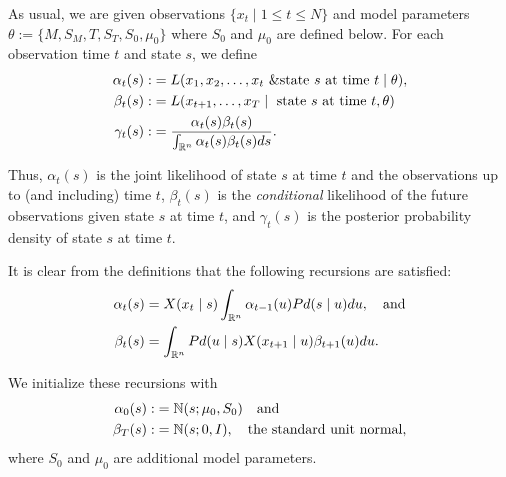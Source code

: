 \documentclass[12pt,leqno]{article}
\begin{document}
As usual, we are given observations $\{x_t\mid 1\le t\le N\}$ and model parameters $\theta := \{M,S_M,T,S_T,S_0,\mu_0\}$
where $S_0$ and $\mu_0$ are defined below.  For each observation time $t$ and state $s$, we define
\begin{align*}
  \alpha_t(s) :&= L(x_1,x_2,\dots,x_t~ \& \text{state $s$ at time $t$}\mid \theta ),\\
  \beta_t(s) :&= L(x_{t+1},\dots,x_T \mid ~\text{state $s$ at time $t$},\theta)\\
  \gamma_t(s) :&= \frac{\alpha_t(s)\beta_t(s)}{\int_{{\mathbb R}^n}\alpha_t(s)\beta_t(s)ds}.
\end{align*}

Thus, $\alpha_t(s)$ is the joint likelihood of state $s$ at time $t$ and the observations up to (and including) time $t$,
$\beta_t(s)$ is the {\em conditional} likelihood of the future observations given state $s$ at time $t$, and $\gamma_t(s)$
is the posterior probability density of state $s$ at time $t$.

It is clear from the definitions that the following recursions are satisfied:
\begin{align}
\alpha_t(s) &= X(x_t \mid s)\int_{{\mathbb R}^n}\alpha_{t-1}(u)Pd(s \mid u)du,\quad\text{and}\label{alpha:0}\\
\beta_t(s) &= \int_{{\mathbb R}^{n}}Pd(u \mid s)X(x_{t+1} \mid u)\beta_{t+1}(u)du.\label{beta:0}
\end{align}

We initialize these recursions with
\begin{align*}
\alpha_0(s) :&= {\mathbb N}(s;\mu_0,S_0)\quad\text{and} \\
\beta_{T}(s) :&= {\mathbb N}(s;0,I), \quad\text{the standard unit normal},
\end{align*}
where $S_0$ and $\mu_0$ are additional model parameters.
\end{document}
